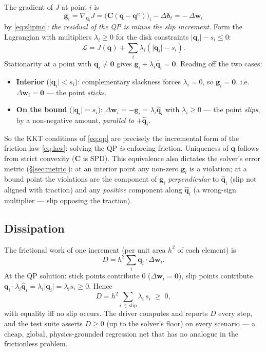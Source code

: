 \documentclass[11pt,a4paper]{article}
\newcommand{\bq}{\mathbf{q}}
\newcommand{\bw}{\mathbf{w}}
\newcommand{\bg}{\mathbf{g}}
\newcommand{\bC}{\mathbf{C}}
\newcommand{\bdelta}{\boldsymbol{\delta}}
\newcommand{\bzero}{\mathbf{0}}
\newcommand{\qhat}{\hat{\bq}}
\newcommand{\abs}[1]{\lvert#1\rvert}
\begin{document}
The gradient of $J$ at point $i$ is
\begin{equation}
  \bg_i = \nabla_{\bq_i} J = \bigl(\bC(\bq - \bq^n)\bigr)_i - \Delta\bdelta_t
        = -\,\Delta\bw_i
  \label{eq:gradient}
\end{equation}
by \eqref{eq:slipinc}: \emph{the residual of the QP is minus the slip
increment}. Form the Lagrangian with multipliers $\lambda_i \ge 0$ for the
disk constraints $\abs{\bq_i} - s_i \le 0$:
\begin{equation}
  \mathcal L = J(\bq) + \sum_i \lambda_i \left( \abs{\bq_i} - s_i \right).
\end{equation}
Stationarity at a point with $\bq_i \ne \bzero$ gives
$\bg_i + \lambda_i \qhat_i = \bzero$. Reading off the two cases:
\begin{itemize}
\item \textbf{Interior} ($\abs{\bq_i} < s_i$): complementary slackness
  forces $\lambda_i = 0$, so $\bg_i = \bzero$, i.e.\
  $\Delta\bw_i = \bzero$ --- the point \emph{sticks}. \checkmark
\item \textbf{On the bound} ($\abs{\bq_i} = s_i$):
  $\Delta\bw_i = -\bg_i = \lambda_i \qhat_i$ with $\lambda_i \ge 0$ --- the
  point \emph{slips}, by a non-negative amount, \emph{parallel to} $+\qhat_i$.
  \checkmark
\end{itemize}
So the KKT conditions of \eqref{eq:qp} are precisely the incremental form of
the friction law \eqref{eq:law}: solving the QP \emph{is} enforcing
friction. Uniqueness of $\bq$ follows from strict convexity ($\bC$ is SPD).
This equivalence also dictates the solver's error metric
(\S\ref{sec:metric}): at an interior point any non-zero $\bg_i$ is a
violation; at a bound point the violations are the component of $\bg_i$
\emph{perpendicular} to $\qhat_i$ (slip not aligned with traction) and any
\emph{positive} component along $\qhat_i$ (a wrong-sign multiplier ---
slip opposing the traction).

\subsection{Dissipation}
\label{sec:dissipation}

The frictional work of one increment (per unit area $h^2$ of each element)
is
\begin{equation}
  D = h^2 \sum_i \bq_i \cdot \Delta\bw_i .
\end{equation}
At the QP solution: stick points contribute $0$ ($\Delta\bw_i = \bzero$),
slip points contribute
$\bq_i \cdot \lambda_i \qhat_i = \lambda_i \abs{\bq_i} = \lambda_i s_i \ge 0$.
Hence
\begin{equation}
  D = h^2 \sum_{i \,\in\, \text{slip}} \lambda_i\, s_i \;\ge\; 0 ,
\end{equation}
with equality iff no slip occurs. The driver computes and reports $D$ every
step, and the test suite asserts $D \ge 0$ (up to the solver's floor) on
every scenario --- a cheap, global, physics-grounded regression net that has
no analogue in the frictionless problem.
\end{document}
